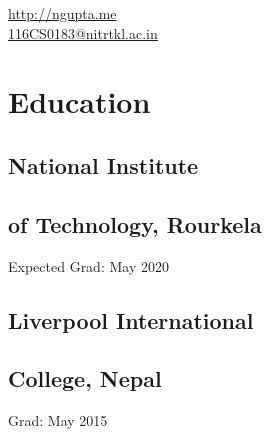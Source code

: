 \documentclass[]{deedy-resume-openfont}
\begin{document}
%
%

%
%


{ 
	\faGlobe \hspace{0mm} \url{http://ngupta.me} \\
	\faEnvelope \hspace{0mm} \href{mailto:116CS0183@nitrtkl.ac.in}{116CS0183@nitrtkl.ac.in}
}

%
%

\begin{minipage}[t]{0.33\textwidth} 


\section{Education} 

\subsection{National Institute}
\subsection{of Technology, Rourkela}
Expected Grad: May 2020 \\
\sectionsep

\subsection{Liverpool International}
\subsection{College, Nepal}
Grad: May 2015 \\
\sectionsep




\end{minipage}
\end{document}
